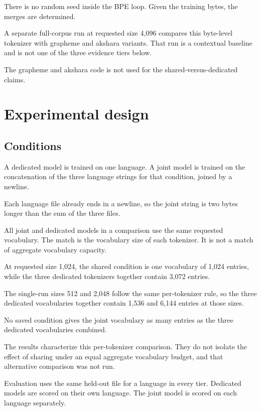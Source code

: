 \documentclass[10pt,twocolumn]{article}
\begin{document}
There is no random seed inside the BPE loop.
Given the training bytes, the merges are determined.

A separate full-corpus run at requested size 4,096
compares this byte-level tokenizer with grapheme and
akshara variants. That run is a contextual baseline
and is not one of the three evidence tiers below.

The grapheme and akshara code is not used for the
shared-versus-dedicated claims.


\section{Experimental design}

\subsection{Conditions}

A dedicated model is trained on one language.
A joint model is trained on the concatenation of the
three language strings for that condition, joined by
a newline.

Each language file already ends in a newline, so the
joint string is two bytes longer than the sum of the
three files.

All joint and dedicated models in a comparison use
the same requested vocabulary. The match is the
vocabulary size of each tokenizer. It is not a match
of aggregate vocabulary capacity.

At requested size 1,024, the shared condition is one
vocabulary of 1,024 entries, while the three dedicated
tokenizers together contain 3,072 entries.

The single-run sizes 512 and 2,048 follow the same
per-tokenizer rule, so the three dedicated vocabularies
together contain 1,536 and 6,144 entries at those sizes.

No saved condition gives the joint vocabulary as many
entries as the three dedicated vocabularies combined.

The results characterize this per-tokenizer comparison.
They do not isolate the effect of sharing under an equal
aggregate vocabulary budget, and that alternative
comparison was not run.

Evaluation uses the same held-out file for a language
in every tier. Dedicated models are scored on their
own language. The joint model is scored on each
language separately.
\end{document}
